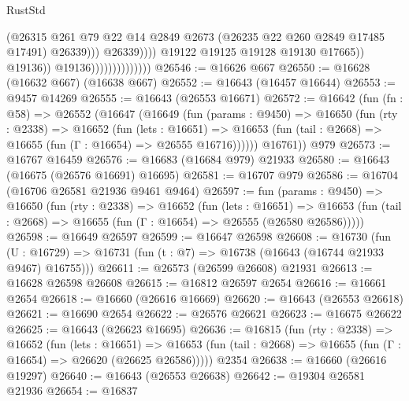 \begin{lexlean}{RustStd}
\begin{coremodule}
                                                    (@26315
                                                      @261
                                                      @79
                                                      @22
                                                      @14
                                                      @2849
                                                      @2673
                                                      (@26235 @22 @260 @2849 @17485 @17491)
                                                      @26339)))
                                                @26339))))
                                        @19122
                                        @19125
                                        @19128
                                        @19130
                                        @17665))
                                    @19136))
                                @19136))))))))))))))
@26546 := @16626 @667
@26550 := @16628 (@16632 @667) (@16638 @667)
@26552 := @16643 (@16457 @16644)
@26553 := @9457 @14269
@26555 := @16643 (@26553 @16671)
@26572 := @16642
    (fun (fn : @58) =>
    @26552
      (@16647
        (@16649
          (fun (params : @9450) =>
          @16650
            (fun (rty : @2338) =>
            @16652
              (fun (lets : @16651) =>
              @16653 (fun (tail : @2668) => @16655 (fun (Γ : @16654) => @26555 @16716))))))
        @16761))
    @979
@26573 := @16767 @16459
@26576 := @16683 (@16684 @979) @21933
@26580 := @16643 (@16675 (@26576 @16691) @16695)
@26581 := @16707 @979
@26586 := @16704 (@16706 @26581 @21936 @9461 @9464)
@26597 := fun (params : @9450) =>
  @16650
    (fun (rty : @2338) =>
    @16652
      (fun (lets : @16651) =>
      @16653 (fun (tail : @2668) => @16655 (fun (Γ : @16654) => @26555 (@26580 @26586)))))
@26598 := @16649 @26597
@26599 := @16647 @26598
@26608 := @16730
    (fun (U : @16729) => @16731 (fun (t : @7) => @16738 (@16643 (@16744 @21933 @9467) @16755)))
@26611 := @26573 (@26599 @26608) @21931
@26613 := @16628 @26598 @26608
@26615 := @16812 @26597 @2654
@26616 := @16661 @2654
@26618 := @16660 (@26616 @16669)
@26620 := @16643 (@26553 @26618)
@26621 := @16690 @2654
@26622 := @26576 @26621
@26623 := @16675 @26622
@26625 := @16643 (@26623 @16695)
@26636 := @16815
    (fun (rty : @2338) =>
    @16652
      (fun (lets : @16651) =>
      @16653 (fun (tail : @2668) => @16655 (fun (Γ : @16654) => @26620 (@26625 @26586)))))
    @2354
@26638 := @16660 (@26616 @19297)
@26640 := @16643 (@26553 @26638)
@26642 := @19304 @26581 @21936
@26654 := @16837

\end{coremodule}
\end{lexlean}
